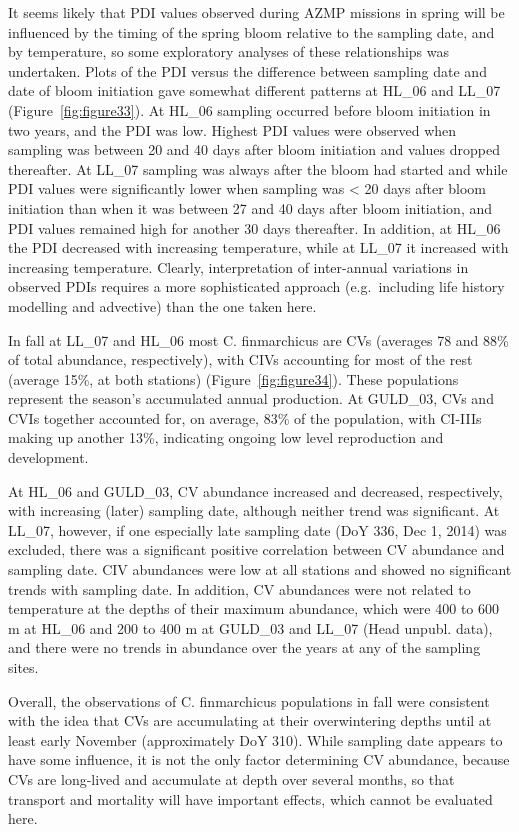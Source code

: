 \documentclass[12pt]{article}\usepackage[]{graphicx}\usepackage[]{color}
\begin{document}
It seems likely that PDI values observed during AZMP missions in spring will be influenced by the timing of the spring bloom relative to the sampling date, and by temperature, so some exploratory analyses of these relationships was undertaken. Plots of the PDI versus the difference between sampling date and date of bloom initiation gave somewhat different patterns at HL\_06 and LL\_07 (Figure~\ref{fig:figure33}). At HL\_06 sampling occurred before bloom initiation in two years, and the PDI was low. Highest PDI values were observed when sampling was between 20 and 40 days after bloom initiation and values dropped thereafter. At LL\_07 sampling was always after the bloom had started and while PDI values were significantly lower when sampling was \textless{} 20 days after bloom initiation than when it was between 27 and 40 days after bloom initiation, and PDI values remained high for another 30 days thereafter. In addition, at HL\_06 the PDI decreased with increasing temperature, while at LL\_07 it increased with increasing temperature. Clearly, interpretation of inter-annual variations in observed PDIs requires a more sophisticated approach (e.g.~including life history modelling and advective) than the one taken here.

In fall at LL\_07 and HL\_06 most C. finmarchicus are CVs (averages 78 and 88\% of total abundance, respectively), with CIVs accounting for most of the rest (average 15\%, at both stations) (Figure~\ref{fig:figure34}). These populations represent the season's accumulated annual production. At GULD\_03, CVs and CVIs together accounted for, on average, 83\% of the population, with CI-IIIs making up another 13\%, indicating ongoing low level reproduction and development.

At HL\_06 and GULD\_03, CV abundance increased and decreased, respectively, with increasing (later) sampling date, although neither trend was significant. At LL\_07, however, if one especially late sampling date (DoY 336, Dec 1, 2014) was excluded, there was a significant positive correlation between CV abundance and sampling date. CIV abundances were low at all stations and showed no significant trends with sampling date. In addition, CV abundances were not related to temperature at the depths of their maximum abundance, which were 400 to 600 m at HL\_06 and 200 to 400 m at GULD\_03 and LL\_07 (Head unpubl. data), and there were no trends in abundance over the years at any of the sampling sites.

Overall, the observations of C. finmarchicus populations in fall were consistent with the idea that CVs are accumulating at their overwintering depths until at least early November (approximately DoY 310). While sampling date appears to have some influence, it is not the only factor determining CV abundance, because CVs are long-lived and accumulate at depth over several months, so that transport and mortality will have important effects, which cannot be evaluated here.
\end{document}
